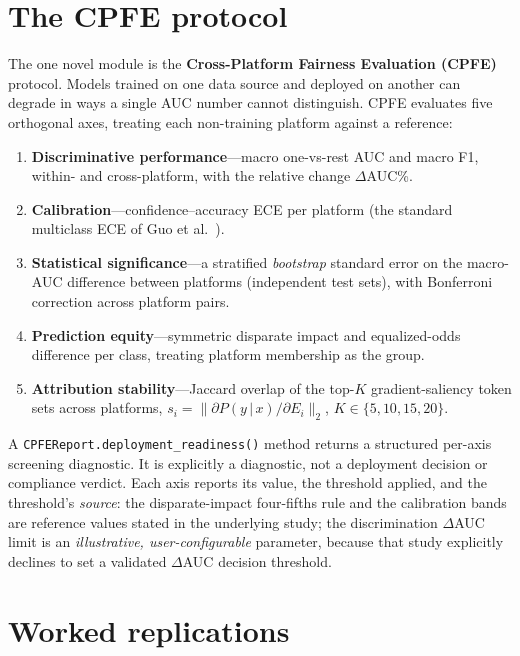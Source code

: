 \documentclass[11pt]{article}
\begin{document}
\section{The CPFE protocol}

The one novel module is the \textbf{Cross-Platform Fairness Evaluation (CPFE)} protocol.
Models trained on one data source and deployed on another can degrade in ways a single AUC
number cannot distinguish. CPFE evaluates five orthogonal axes, treating each non-training
platform against a reference:

\begin{enumerate}
  \item \textbf{Discriminative performance}---macro one-vs-rest AUC and macro F1, within- and
    cross-platform, with the relative change $\Delta$AUC\%.
  \item \textbf{Calibration}---confidence--accuracy ECE per platform (the standard multiclass
    ECE of Guo et al.~\cite{guo}).
  \item \textbf{Statistical significance}---a stratified \emph{bootstrap} standard error on the
    macro-AUC difference between platforms (independent test sets), with Bonferroni correction
    across platform pairs.
  \item \textbf{Prediction equity}---symmetric disparate impact and equalized-odds difference
    per class, treating platform membership as the group.
  \item \textbf{Attribution stability}---Jaccard overlap of the top-$K$ gradient-saliency
    token sets across platforms, $s_i = \|\partial P(y\,|\,x)/\partial E_i\|_2$,
    $K \in \{5,10,15,20\}$.
\end{enumerate}

A \texttt{CPFEReport.deployment\_readiness()} method returns a structured per-axis screening
diagnostic. It is explicitly a diagnostic, not a deployment decision or compliance verdict.
Each axis reports its value, the threshold applied, and the threshold's \emph{source}: the
disparate-impact four-fifths rule and the calibration bands are reference values stated in the
underlying study; the discrimination $\Delta$AUC limit is an \emph{illustrative,
user-configurable} parameter, because that study explicitly declines to set a validated
$\Delta$AUC decision threshold.

\section{Worked replications}
\end{document}
